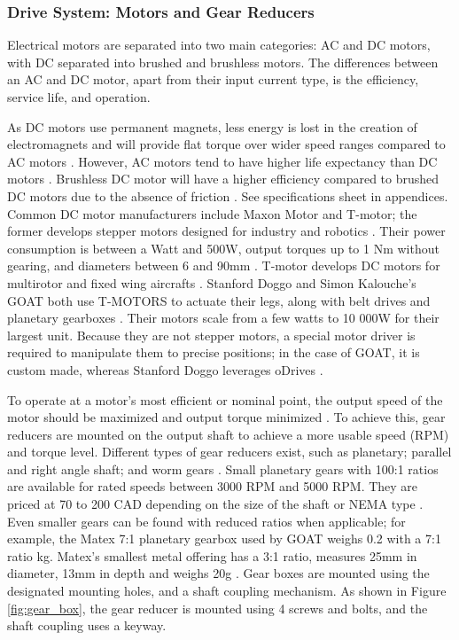 
\subsubsection{Drive System: Motors and Gear Reducers}

Electrical motors are separated into two main categories: AC and DC motors, with DC separated into brushed and brushless motors. The differences between an AC and DC motor, apart from their input current type, is the efficiency, service life, and operation.

As DC motors use permanent magnets, less energy is lost in the creation of electromagnets and will provide flat torque over wider speed ranges compared to AC motors \cite{oriental_motor_brushless_nodate}. However, AC motors tend to have higher life expectancy than DC motors \cite{ohio_electric_motors_what_2015}. Brushless DC motor will have a higher efficiency compared to brushed DC motors due to the absence of friction \cite{oriental_motor_brushless_nodate}\cite{robots_shop_24v_nodate}. 
See specifications sheet in appendices.
Common DC motor manufacturers include Maxon Motor and T-motor; the former develops stepper motors designed for industry and robotics \cite{maxon_motor_applications_nodate}. Their power consumption is between a Watt and 500W, output torques up to 1 Nm without gearing, and diameters between 6 and 90mm \cite{maxon_motor_maxon_nodate}.
T-motor develops DC motors for multirotor and fixed wing aircrafts \cite{t-motor_t-motor_nodate}.
Stanford Doggo and Simon Kalouche's GOAT both use T-MOTORS to actuate their legs, along with belt drives and planetary gearboxes \cite{kalouche_design_2016} \cite{kau_nate711/stanforddoggoproject_2019}.
Their motors scale from a few watts to 10 000W for their largest unit.
Because they are not stepper motors, a special motor driver is required to manipulate them to precise positions; in the case of GOAT, it is custom made, whereas Stanford Doggo leverages oDrives \cite{weigl_odrive_nodate}.


To operate at a motor's most efficient or nominal point, the output speed of the motor should be maximized and output torque minimized \cite{khan_minihyq_2015}. To achieve this, gear reducers are mounted on the output shaft to achieve a more usable speed (RPM) and torque level. Different types of gear reducers exist, such as planetary; parallel and right angle shaft; and worm gears \cite{groschopp_motor_2018}. Small planetary gears with 100:1 ratios are available for rated speeds between 3000 RPM and 5000 RPM. They are priced at  70 to 200 CAD depending on the size of the shaft or NEMA type \cite{banggood_nema_nodate}. Even smaller gears can be found with reduced ratios when applicable; for example, the Matex 7:1 planetary gearbox used by GOAT weighs 0.2 with a 7:1 ratio kg\cite{kalouche_design_2016}. Matex's smallest metal offering has a 3:1 ratio, measures 25mm in diameter, 13mm in depth and weighs 20g \cite{matex_sintered_nodate}. Gear boxes are mounted using the designated mounting holes, and a shaft coupling mechanism. As shown in Figure \ref{fig:gear_box}, the gear reducer is mounted using 4 screws and bolts, and the shaft coupling uses a keyway.

